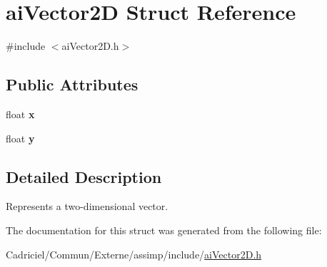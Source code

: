 \hypertarget{structai_vector2_d}{\section{ai\-Vector2\-D Struct Reference}
\label{structai_vector2_d}
}


{\ttfamily \#include $<$ai\-Vector2\-D.\-h$>$}

\subsection*{Public Attributes}
\begin{DoxyCompactItemize}
\item 
\hypertarget{structai_vector2_d_a968e4db235e054f58b4c320576d82740}{float {\bfseries x}}\label{structai_vector2_d_a968e4db235e054f58b4c320576d82740}

\item 
\hypertarget{structai_vector2_d_a7bb1686f941459496627a3b8ce68e73f}{float {\bfseries y}}\label{structai_vector2_d_a7bb1686f941459496627a3b8ce68e73f}

\end{DoxyCompactItemize}


\subsection{Detailed Description}
Represents a two-\/dimensional vector. 

The documentation for this struct was generated from the following file\-:\begin{DoxyCompactItemize}
\item 
Cadriciel/\-Commun/\-Externe/assimp/include/\hyperlink{ai_vector2_d_8h}{ai\-Vector2\-D.\-h}\end{DoxyCompactItemize}
